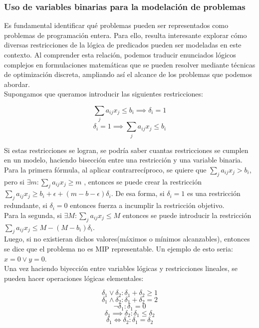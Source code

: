 \documentclass[runningheads]{llncs}
\begin{document}
\subsubsection{Uso de variables binarias para la modelación de problemas\\}


Es fundamental identificar qué problemas pueden ser representados como problemas de programación entera. Para ello, resulta interesante explorar cómo diversas restricciones de la lógica de predicados pueden ser modeladas en este contexto. Al comprender esta relación, podemos traducir enunciados lógicos complejos en formulaciones matemáticas que se pueden resolver mediante técnicas de optimización discreta, ampliando así el alcance de los problemas que podemos abordar.\\

Supongamos que queramos introducir las siguientes restricciones:

$$ \sum_j a_{ij}x_j \leq  b_i \implies  \delta_i = 1$$
$$  \delta_i = 1 \implies  \sum_j a_{ij}x_j \leq  b_i$$

Si estas restricciones se logran, se podría saber cuantas restricciones se cumplen en un modelo, haciendo bisección entre una restricción y una variable binaria.\\

Para la primera fórmula, al aplicar contrarrecíproco, se quiere que $\sum_j a_{ij}x_j > b_i$, pero si $\exists m:\sum_j a_{ij}x_j\geq  m$ , entonces se puede crear la restricción $\sum_j a_{ij}x_j \geq  b_i+\epsilon+(m-b-\epsilon)\delta_i$. De esa forma, si $\delta_i=1$ es una restricción redundante, si $\delta_i=0$ entonces fuerza a incumplir la restricción objetivo.\\

Para la segunda, si $\exists M:\sum_j a_{ij}x_j\leq  M$ entonces se puede introducir la restricción $\sum_j a_{ij}x_j \leq  M-(M-b_i)\delta_i$. \\

Luego, si no existieran dichos valores(máximos o mínimos alcanzables), entonces se dice que el problema no es MIP representable. Un ejemplo de esto seria: $x=0\lor  y=0$.\\

Una vez haciendo biyección entre variables lógicas y restricciones lineales, se pueden hacer operaciones lógicas elementales:

$$\delta_1 \lor  \delta_2:\delta_1+\delta_2\geq 1$$
$$\delta_1 \land \delta_2:\delta_1+\delta_2=2$$
$$\neg\delta_1 :\delta_1=0$$
$$\delta_1 \implies  \delta_2:\delta_1\leq  \delta_2$$
$$\delta_1 \iff \delta_2:\delta_1=\delta_2$$
\end{document}
